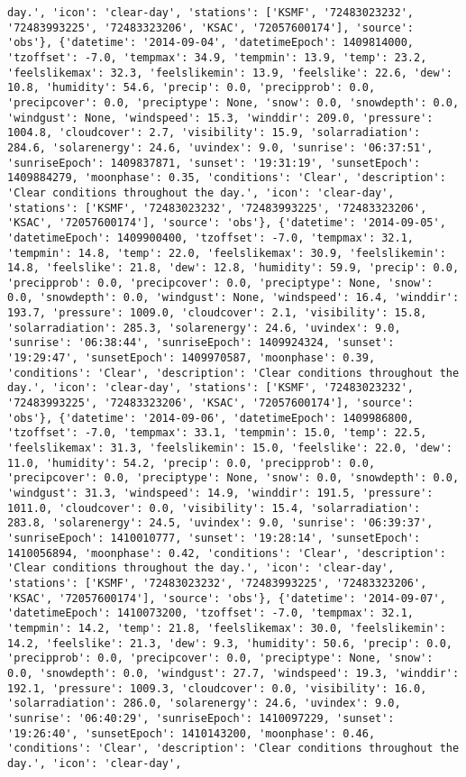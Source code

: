 \documentclass[
  letterpaper,
  DIV=11,
  numbers=noendperiod]{scrartcl}
\begin{document}
\begin{verbatim}
day.', 'icon': 'clear-day', 'stations': ['KSMF', '72483023232', '72483993225', '72483323206', 'KSAC', '72057600174'], 'source': 'obs'}, {'datetime': '2014-09-04', 'datetimeEpoch': 1409814000, 'tzoffset': -7.0, 'tempmax': 34.9, 'tempmin': 13.9, 'temp': 23.2, 'feelslikemax': 32.3, 'feelslikemin': 13.9, 'feelslike': 22.6, 'dew': 10.8, 'humidity': 54.6, 'precip': 0.0, 'precipprob': 0.0, 'precipcover': 0.0, 'preciptype': None, 'snow': 0.0, 'snowdepth': 0.0, 'windgust': None, 'windspeed': 15.3, 'winddir': 209.0, 'pressure': 1004.8, 'cloudcover': 2.7, 'visibility': 15.9, 'solarradiation': 284.6, 'solarenergy': 24.6, 'uvindex': 9.0, 'sunrise': '06:37:51', 'sunriseEpoch': 1409837871, 'sunset': '19:31:19', 'sunsetEpoch': 1409884279, 'moonphase': 0.35, 'conditions': 'Clear', 'description': 'Clear conditions throughout the day.', 'icon': 'clear-day', 'stations': ['KSMF', '72483023232', '72483993225', '72483323206', 'KSAC', '72057600174'], 'source': 'obs'}, {'datetime': '2014-09-05', 'datetimeEpoch': 1409900400, 'tzoffset': -7.0, 'tempmax': 32.1, 'tempmin': 14.8, 'temp': 22.0, 'feelslikemax': 30.9, 'feelslikemin': 14.8, 'feelslike': 21.8, 'dew': 12.8, 'humidity': 59.9, 'precip': 0.0, 'precipprob': 0.0, 'precipcover': 0.0, 'preciptype': None, 'snow': 0.0, 'snowdepth': 0.0, 'windgust': None, 'windspeed': 16.4, 'winddir': 193.7, 'pressure': 1009.0, 'cloudcover': 2.1, 'visibility': 15.8, 'solarradiation': 285.3, 'solarenergy': 24.6, 'uvindex': 9.0, 'sunrise': '06:38:44', 'sunriseEpoch': 1409924324, 'sunset': '19:29:47', 'sunsetEpoch': 1409970587, 'moonphase': 0.39, 'conditions': 'Clear', 'description': 'Clear conditions throughout the day.', 'icon': 'clear-day', 'stations': ['KSMF', '72483023232', '72483993225', '72483323206', 'KSAC', '72057600174'], 'source': 'obs'}, {'datetime': '2014-09-06', 'datetimeEpoch': 1409986800, 'tzoffset': -7.0, 'tempmax': 33.1, 'tempmin': 15.0, 'temp': 22.5, 'feelslikemax': 31.3, 'feelslikemin': 15.0, 'feelslike': 22.0, 'dew': 11.0, 'humidity': 54.2, 'precip': 0.0, 'precipprob': 0.0, 'precipcover': 0.0, 'preciptype': None, 'snow': 0.0, 'snowdepth': 0.0, 'windgust': 31.3, 'windspeed': 14.9, 'winddir': 191.5, 'pressure': 1011.0, 'cloudcover': 0.0, 'visibility': 15.4, 'solarradiation': 283.8, 'solarenergy': 24.5, 'uvindex': 9.0, 'sunrise': '06:39:37', 'sunriseEpoch': 1410010777, 'sunset': '19:28:14', 'sunsetEpoch': 1410056894, 'moonphase': 0.42, 'conditions': 'Clear', 'description': 'Clear conditions throughout the day.', 'icon': 'clear-day', 'stations': ['KSMF', '72483023232', '72483993225', '72483323206', 'KSAC', '72057600174'], 'source': 'obs'}, {'datetime': '2014-09-07', 'datetimeEpoch': 1410073200, 'tzoffset': -7.0, 'tempmax': 32.1, 'tempmin': 14.2, 'temp': 21.8, 'feelslikemax': 30.0, 'feelslikemin': 14.2, 'feelslike': 21.3, 'dew': 9.3, 'humidity': 50.6, 'precip': 0.0, 'precipprob': 0.0, 'precipcover': 0.0, 'preciptype': None, 'snow': 0.0, 'snowdepth': 0.0, 'windgust': 27.7, 'windspeed': 19.3, 'winddir': 192.1, 'pressure': 1009.3, 'cloudcover': 0.0, 'visibility': 16.0, 'solarradiation': 286.0, 'solarenergy': 24.6, 'uvindex': 9.0, 'sunrise': '06:40:29', 'sunriseEpoch': 1410097229, 'sunset': '19:26:40', 'sunsetEpoch': 1410143200, 'moonphase': 0.46, 'conditions': 'Clear', 'description': 'Clear conditions throughout the day.', 'icon': 'clear-day', 
\end{verbatim}
\end{document}
